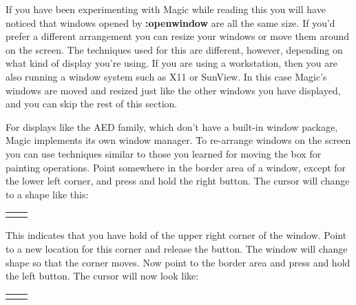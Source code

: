 \documentclass[letterpaper,twoside,12pt]{article}
\begin{document}
If you have been experimenting with Magic while reading this you
will have noticed that windows opened by {\bfseries :openwindow} are all 
the same size.  If you'd prefer a different arrangement you can
resize your windows or move them around on the screen.  The techniques
used for this are different, however, depending on what kind of
display you're using.  If you are using a workstation, then you are also
running a window system such as X11 or SunView.  In this case Magic's 
windows are moved and resized just like the other windows you have displayed,
and you can skip the rest of this section.

For displays like the AED family, which don't have a built-in window
package, Magic implements its own window manager.  To re-arrange
windows on the screen you
can use techniques similar to those you
learned for moving the box for painting operations.
Point somewhere in the border area of a window, except for the lower left
corner, and press and hold the right button.  The
cursor will change to a shape like this:

\begin{center}
   \begin{tabular}{c|c|}\hline
	\hspace*{0.1in} & \hspace*{0.1in} \\ \hline
	\hspace*{0.1in} & \hspace*{0.1in} \\
   \end{tabular}
\end{center}

This indicates that you have hold of the upper right corner of the
window.  Point to a new location for this corner and release the
button.  The window will change shape so that the corner moves.
Now point to the border area and press and hold the left button.
The cursor will now look like:

\begin{center}
   \begin{tabular}{|c|c|}\hline
	\hspace*{0.1in} & \hspace*{0.1in} \\ \hline
	\hspace*{0.1in} & \hspace*{0.1in} \\ \hline
   \end{tabular}
\end{center}
\end{document}
